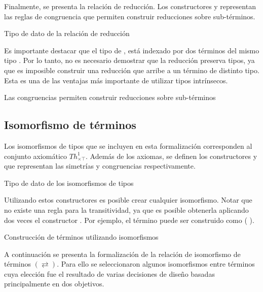 Finalmente, se presenta la relación de reducción.
Los constructores \const{$\xi$} y \const{$\zeta$} representan las reglas de congruencia que permiten construir reducciones sobre sub-términos.

\begin{codigo}
	Tipo de dato de la relación de reducción
	
\end{codigo}

Es importante destacar que el tipo de \type{$\_\hookrightarrow\_$}, está indexado por dos términos del mismo tipo .
Por lo tanto, no es necesario demostrar que la reducción preserva tipos, ya que es imposible construir una reducción que arribe a un término de distinto tipo.
Esta es una de las ventajas más importante de utilizar tipos intrínsecos.

\begin{example}
	Las congruencias permiten construir reducciones sobre sub-términos
\end{example}

\subsection{Isomorfismo de términos}

Los isomorfismos de tipos que se incluyen en esta formalización corresponden al conjunto axiomático $Th^1_{\times\top}$.
Además de los axiomas, se definen los constructores  y  que representan las simetrías y congruencias respectivamente.

\begin{codigo}
	Tipo de dato de los isomorfismos de tipos
	
\end{codigo}
Utilizando estos constructores es posible crear cualquier isomorfismo.
Notar que no existe una regla para la transitividad, ya que es posible obtenerla aplicando dos veces el constructor \const{$[\_]\equiv\_$}.
Por ejemplo, el término \const{[ trans}   \const{]$\equiv$}  puede ser construido como \const{[}  \const{]$\equiv$} (\const{[}  \const{]$\equiv$} ).

\begin{example}
	Construcción de términos utilizando isomorfismos
\end{example}

A continuación se presenta la formalización de la relación de isomorfismo de términos $(\rightleftarrows)$.
Para ello se seleccionaron algunos isomorfismos entre términos cuya elección fue el resultado de varias decisiones de diseño basadas principalmente en dos objetivos.

